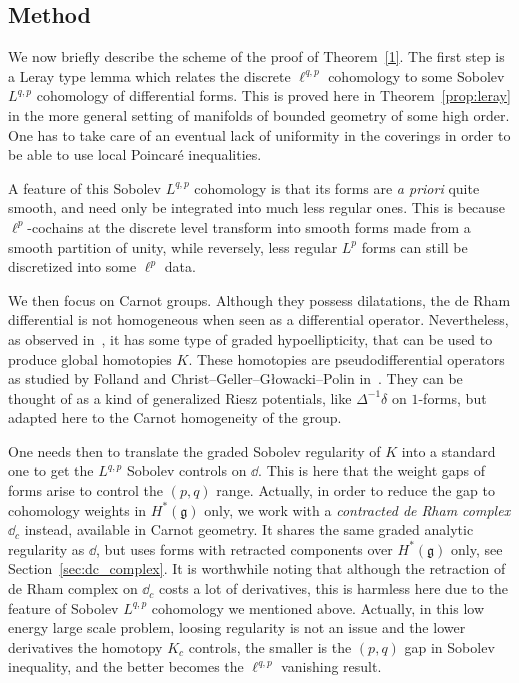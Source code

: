 \subsection{Method}\label{sec:method}

We now briefly describe the scheme of the proof of Theorem~\ref{1}. The first step is a Leray type lemma which relates the discrete $\ell^{q,p}$ cohomology to some Sobolev $L^{q,p}$ cohomology of differential forms. This is proved here in Theorem~\ref{prop:leray} in the more general setting of manifolds of bounded geometry of some high order. One has to take care of an eventual lack of uniformity in the coverings in order to be able to use local Poincar\'e inequalities.

A feature of this Sobolev $L^{q,p}$ cohomology is that its forms are
\emph{a priori} quite smooth, and need only be integrated into much less regular ones. This is because $\ell^p$-cochains at the discrete level transform into smooth forms made from a smooth partition of unity, while reversely, less regular $L^p$ forms can still be discretized into some $\ell^p$ data.

We then focus on Carnot groups. Although they possess dilatations, the de Rham differential is not homogeneous when seen as a differential operator. Nevertheless, as observed in~\cite{Rumin_CRAS_1999}, it has some type of graded hypoellipticity, that can be used to produce global homotopies $K$. These homotopies are pseudodifferential operators as studied by Folland and Christ--Geller--G{\l}owacki--Polin in~\cite{CGGP,Folland_1975}. They can be thought of as a kind of generalized Riesz potentials, like $\Delta^{-1}\delta$ on $1$-forms, but adapted here to the Carnot homogeneity of the group.

One needs then to translate the graded Sobolev regularity of $K$ into a standard one to get the $L^{q,p}$ Sobolev controls on $\dd$. This is here that the weight gaps of forms arise to control the $(p,q)$ range. Actually, in order to reduce the gap to cohomology weights in $H^*(\mathfrak{g})$ only, we work with a \emph{contracted de Rham complex} $\dd_c$ instead, available in Carnot geometry. It shares the same graded analytic regularity as $\dd$, but uses forms with retracted components over $H^*(\mathfrak{g})$ only, see Section~\ref{sec:dc_complex}. It is worthwhile noting that although the retraction of de Rham complex on $\dd_c$ costs a lot of derivatives, this is harmless here due to the feature of Sobolev $L^{q,p}$ cohomology we mentioned above. Actually, in this low energy large scale problem, loosing regularity is not an issue and the lower derivatives the homotopy $K_c$ controls, the smaller is the $(p,q)$ gap in Sobolev inequality, and the better becomes the $\ell^{q,p}$ vanishing result.

